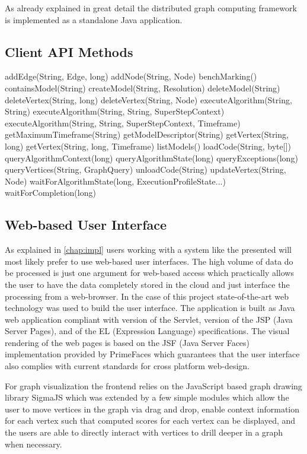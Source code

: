 As already explained in great detail the distributed graph computing framework is implemented as a standalone Java application. 


\subsection{Client API Methods}
\label{appendix:clientapimethods}

addEdge(String, Edge, long)
addNode(String, Node)
benchMarking()
containsModel(String)
createModel(String, Resolution)
deleteModel(String)
deleteVertex(String, long)
deleteVertex(String, Node)
executeAlgorithm(String, String)
executeAlgorithm(String, String, SuperStepContext)
executeAlgorithm(String, String, SuperStepContext, Timeframe)
getMaximumTimeframe(String)
getModelDescriptor(String)
getVertex(String, long)
getVertex(String, long, Timeframe)
listModels()
loadCode(String, byte[])
queryAlgorithmContext(long)
queryAlgorithmState(long)
queryExceptions(long)
queryVertices(String, GraphQuery)
unloadCode(String)
updateVertex(String, Node)
waitForAlgorithmState(long, ExecutionProfileState...)
waitForCompletion(long)


\subsection{Web-based User Interface}
\label{appendix:frontend}

As explained in \ref{chap:impl} users working with a system like the presented will most likely prefer to use web-based user interfaces. The high volume of data do be processed is just one argument for web-based access which practically allows the user to have the data completely stored in the cloud and just interface the processing from a web-browser. In the case of this project state-of-the-art web technology was used to build the user interface. The application is built as Java web application compliant with version \versionServlet{} of the Servlet, version \versionJSP{} of the JSP (Java Server Pages), and \versionEL{} of the EL (Expression Language) specifications. The visual rendering of the web pages is based on the JSF (Java Server Faces) \versionJSF{} implementation provided by PrimeFaces \versionPrimeFaces{} which guarantees that the user interface also complies with current standards for cross platform web-design.

For graph visualization the frontend relies on the JavaScript based graph drawing library SigmaJS \versionSigmaJS{} which was extended by a few simple modules which allow the user to move vertices in the graph via drag and drop, enable context information for each vertex such that computed scores for each vertex can be displayed, and the users are able to directly interact with vertices to drill deeper in a graph when necessary.

